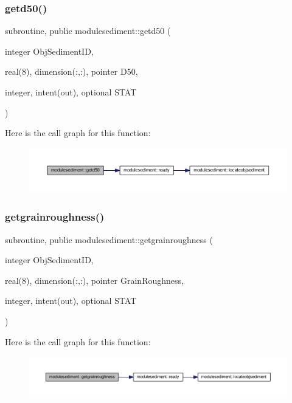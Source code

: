 \subsubsection{\texorpdfstring{getd50()}{getd50()}}
{\footnotesize\ttfamily subroutine, public modulesediment\+::getd50 (\begin{DoxyParamCaption}\item[{integer}]{Obj\+Sediment\+ID,  }\item[{real(8), dimension(\+:,\+:), pointer}]{D50,  }\item[{integer, intent(out), optional}]{S\+T\+AT }\end{DoxyParamCaption})}

Here is the call graph for this function\+:\nopagebreak
\begin{figure}[H]
\begin{center}
\leavevmode
\includegraphics[width=350pt]{namespacemodulesediment_aa0d71895956b87280c4aa42094f08fdd_cgraph}
\end{center}
\end{figure}
\mbox{\label{namespacemodulesediment_ac873ffbc4a1e0467d82815aeb2ad34cc}} 
\subsubsection{\texorpdfstring{getgrainroughness()}{getgrainroughness()}}
{\footnotesize\ttfamily subroutine, public modulesediment\+::getgrainroughness (\begin{DoxyParamCaption}\item[{integer}]{Obj\+Sediment\+ID,  }\item[{real(8), dimension(\+:,\+:), pointer}]{Grain\+Roughness,  }\item[{integer, intent(out), optional}]{S\+T\+AT }\end{DoxyParamCaption})}

Here is the call graph for this function\+:\nopagebreak
\begin{figure}[H]
\begin{center}
\leavevmode
\includegraphics[width=350pt]{namespacemodulesediment_ac873ffbc4a1e0467d82815aeb2ad34cc_cgraph}
\end{center}
\end{figure}
\mbox{\label{namespacemodulesediment_a1b6836cb590222a61d3ec36961ce22c2}} 

